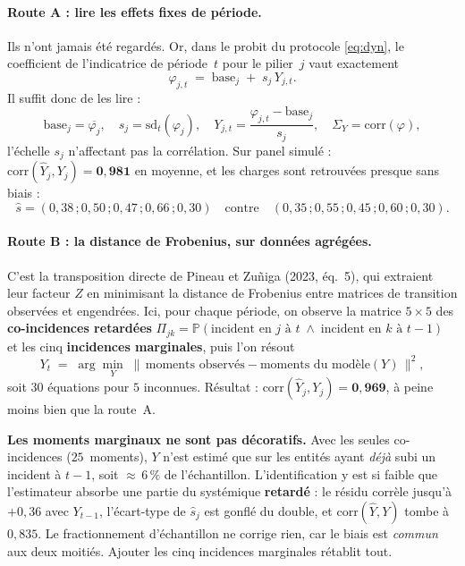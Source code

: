 \documentclass[11pt,a4paper]{article}
\newcommand{\Y}{Y}
\begin{document}
\paragraph{Route A : lire les effets fixes de période.} Ils n'ont jamais été regardés. Or,
dans le probit du protocole \eqref{eq:dyn}, le coefficient de l'indicatrice de période~$t$
pour le pilier~$j$ vaut exactement
\[
\varphi_{j,t} \;=\; \text{base}_j \;+\; s_j\,\Y_{j,t}.
\]
Il suffit donc de les lire :
\[
\text{base}_j = \overline{\varphi_j}, \quad
s_j = \mathrm{sd}_t(\varphi_j), \quad
\Y_{j,t} = \frac{\varphi_{j,t}-\text{base}_j}{s_j}, \quad
\Sigma_Y = \mathrm{corr}(\varphi),
\]
l'échelle $s_j$ n'affectant pas la corrélation. Sur
panel simulé : $\mathrm{corr}(\hat\Y_j,\Y_j) = \mathbf{0{,}981}$ en moyenne, et les charges
sont retrouvées presque sans biais :
\[
\hat s = (0{,}38\,;0{,}50\,;0{,}47\,;0{,}66\,;0{,}30) \quad\text{contre}\quad (0{,}35\,;0{,}55\,;0{,}45\,;0{,}60\,;0{,}30).
\]

\paragraph{Route B : la distance de Frobenius, sur données agrégées.} C'est la transposition
directe de Pineau et Zu\~niga (2023, éq.~5), qui extraient leur facteur $Z$ en minimisant la
distance de Frobenius entre matrices de transition observées et engendrées. Ici, pour chaque
période, on observe la matrice $5\times 5$ des \textbf{co-incidences retardées}
$\Pi_{jk} = \mathbb P(\text{incident en } j \text{ à } t \;\wedge\; \text{incident en } k
\text{ à } t\!-\!1)$ et les cinq \textbf{incidences marginales}, puis l'on résout
\begin{equation}
\Y_t \;=\; \arg\min_{\Y} \;\big\|\,\text{moments observés} - \text{moments du modèle}(\Y)\,\big\|^2 ,
\end{equation}
soit $30$ équations pour $5$ inconnues. Résultat : $\mathrm{corr}(\hat\Y_j,\Y_j) =
\mathbf{0{,}969}$, à peine moins bien que la route~A.

\begin{attention}
\textbf{Les moments marginaux ne sont pas décoratifs.} Avec les seules co-incidences
($25$~moments), $\Y$ n'est estimé que sur les entités ayant \emph{déjà} subi un incident à
$t\!-\!1$, soit ${\approx}\,6\,\%$ de l'échantillon. L'identification y est si faible que
l'estimateur absorbe une partie du systémique \textbf{retardé} : le résidu corrèle jusqu'à
$+0{,}36$ avec $\Y_{t-1}$, l'écart-type de $\hat s_j$ est gonflé du double, et
$\mathrm{corr}(\hat\Y,\Y)$ tombe à $0{,}835$. Le fractionnement d'échantillon ne corrige
rien, car le biais est \emph{commun} aux deux moitiés. Ajouter les cinq incidences marginales
rétablit tout.
\end{attention}
\end{document}

